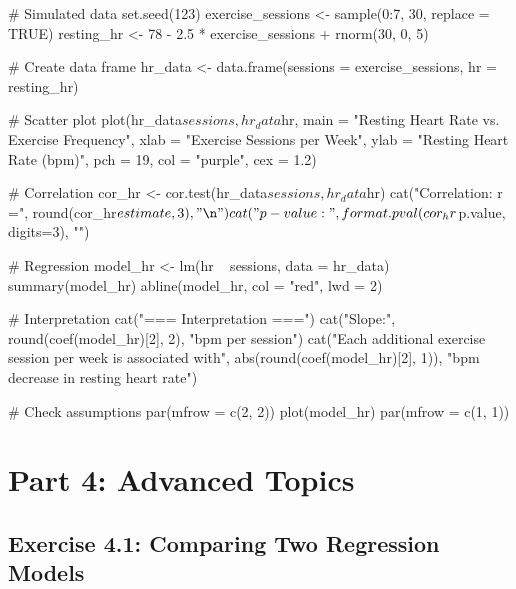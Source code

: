 \documentclass[11pt]{article}
\begin{document}
\begin{rcode}
# Simulated data
set.seed(123)
exercise_sessions <- sample(0:7, 30, replace = TRUE)
resting_hr <- 78 - 2.5 * exercise_sessions + rnorm(30, 0, 5)

# Create data frame
hr_data <- data.frame(sessions = exercise_sessions, hr = resting_hr)

# Scatter plot
plot(hr_data$sessions, hr_data$hr,
     main = "Resting Heart Rate vs. Exercise Frequency",
     xlab = "Exercise Sessions per Week",
     ylab = "Resting Heart Rate (bpm)",
     pch = 19, col = "purple", cex = 1.2)

# Correlation
cor_hr <- cor.test(hr_data$sessions, hr_data$hr)
cat("Correlation: r =", round(cor_hr$estimate, 3), "\n")
cat("p-value:", format.pval(cor_hr$p.value, digits=3), "\n\n")

# Regression
model_hr <- lm(hr ~ sessions, data = hr_data)
summary(model_hr)
abline(model_hr, col = "red", lwd = 2)

# Interpretation
cat("\n=== Interpretation ===\n")
cat("Slope:", round(coef(model_hr)[2], 2), "bpm per session\n")
cat("Each additional exercise session per week is associated with",
    abs(round(coef(model_hr)[2], 1)), "bpm decrease in resting heart rate\n")

# Check assumptions
par(mfrow = c(2, 2))
plot(model_hr)
par(mfrow = c(1, 1))
\end{rcode}

\section{Part 4: Advanced Topics}

\subsection{Exercise 4.1: Comparing Two Regression Models}
\end{document}
